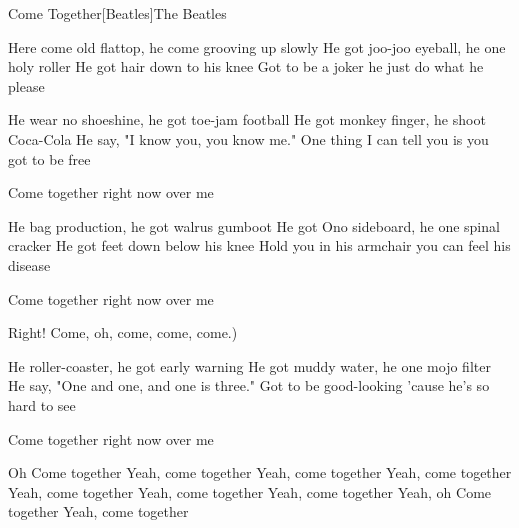 \documentclass[a4paper,11pt,french]{article}
\begin{document}

\begin{Song}{Come Together}[Beatles]{The Beatles}
\begin{multicols}{2}

\begin{Verse}
Here come old flattop, he come grooving up slowly
He got joo-joo eyeball, he one holy roller
He got hair down to his knee
Got to be a joker he just do what he please
\espaceInterStrophe

He wear no shoeshine, he got toe-jam football
He got monkey finger, he shoot Coca-Cola
He say, "I know you, you know me."
One thing I can tell you is you got to be free
\end{Verse}
\espaceInterStrophe

\begin{Chorus}
Come together right now over me
\end{Chorus}
\espaceInterStrophe

\begin{Verse}
He bag production, he got walrus gumboot
He got Ono sideboard, he one spinal cracker
He got feet down below his knee
Hold you in his armchair you can feel his disease
\end{Verse}
\espaceInterStrophe

\begin{Chorus}
Come together right now over me
\espaceInterStrophe

Right!
Come, oh, come, come, come.)
\end{Chorus}
\columnbreak

\begin{Verse}
He roller-coaster, he got early warning
He got muddy water, he one mojo filter
He say, "One and one, and one is three."
Got to be good-looking 'cause he's so hard to see
\end{Verse}
\espaceInterStrophe

\begin{Chorus}
Come together right now over me
\espaceInterStrophe

Oh
Come together
Yeah, come together
Yeah, come together
Yeah, come together
Yeah, come together
Yeah, come together
Yeah, come together
Yeah, oh
Come together
Yeah, come together
\end{Chorus}

\end{multicols}

\vfill


\end{Song}
\end{document}

